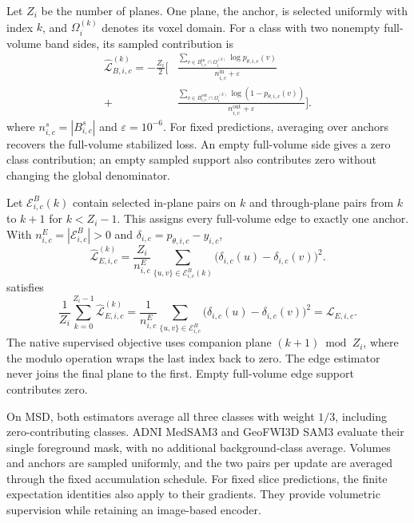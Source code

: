 \documentclass[12pt,a4paper]{article}
\begin{document}
Let $Z_i$ be the number of planes. One plane, the anchor, is selected
uniformly with index $k$, and $\Omega_i^{(k)}$ denotes its voxel domain.
For a class with two nonempty full-volume band sides, its sampled
contribution is
\begin{equation}
\begin{aligned}
\widehat{\mathcal{L}}_{B,i,c}^{(k)}
=-\frac{Z_i}{2}\Biggl[
 &\frac{\sum_{v\in B_{i,c}^{\mathrm{in}}\cap\Omega_i^{(k)}}
                  \log p_{\theta,i,c}(v)}
        {n_{i,c}^{\mathrm{in}}+\varepsilon}\\
 {}+{}&\frac{\sum_{v\in B_{i,c}^{\mathrm{out}}\cap\Omega_i^{(k)}}
                  \log(1-p_{\theta,i,c}(v))}
        {n_{i,c}^{\mathrm{out}}+\varepsilon}\Biggr].
\end{aligned}
\label{eq:medsam-sampled-band-loss}
\end{equation}
where $n_{i,c}^s=|B_{i,c}^s|$ and $\varepsilon=10^{-6}$.
For fixed predictions, averaging over anchors recovers the full-volume
stabilized loss. An empty full-volume side gives a zero class contribution;
an empty sampled support also contributes zero without changing the
global denominator.

Let $\mathcal E_{i,c}^B(k)$ contain selected in-plane pairs on $k$
and through-plane pairs from $k$ to $k+1$ for $k<Z_i-1$.
This assigns every full-volume edge to exactly one anchor. With
$n_{i,c}^E=|\mathcal E_{i,c}^B|>0$ and
$\delta_{i,c}=p_{\theta,i,c}-y_{i,c}$,
\begin{equation}
\widehat{\mathcal{L}}_{E,i,c}^{(k)}
=\frac{Z_i}{n_{i,c}^E}
  \sum_{\{u,v\}\in\mathcal{E}_{i,c}^B(k)}
    \bigl(\delta_{i,c}(u)-\delta_{i,c}(v)\bigr)^2.
\label{eq:medsam-sampled-edge-loss}
\end{equation}
satisfies
\begin{equation}
\frac{1}{Z_i}\sum_{k=0}^{Z_i-1}
  \widehat{\mathcal{L}}_{E,i,c}^{(k)}
=\frac{1}{n_{i,c}^E}\sum_{\{u,v\}\in\mathcal{E}_{i,c}^B}
    \bigl(\delta_{i,c}(u)-\delta_{i,c}(v)\bigr)^2
=\mathcal{L}_{E,i,c}.
\label{eq:medsam-edge-expectation}
\end{equation}
The native supervised objective uses companion plane
$(k+1)\bmod Z_i$, where the modulo operation wraps the last index back
to zero. The edge estimator never joins the final plane to the first. Empty full-volume edge support contributes zero.

On MSD, both estimators average all three classes with weight $1/3$,
including zero-contributing classes. ADNI MedSAM3 and GeoFWI3D SAM3
evaluate their single foreground mask, with no additional
background-class average. Volumes and anchors are sampled
uniformly, and the two pairs per update are averaged through the
fixed accumulation schedule. For fixed slice predictions, the finite
expectation identities also apply to their gradients. They provide
volumetric supervision while retaining an image-based encoder.
\end{document}

